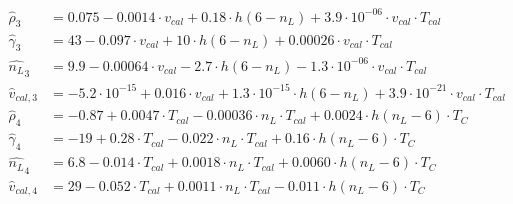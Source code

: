\begin{align}
%
%
%
    \label{eq:emma-phd3}
    \hat{\rho}_3 &= 0.075  -   0.0014 \cdot  v_{cal}  +    0.18 \cdot  h(6-n_L)  + 3.9\cdot 10^{-06} \cdot  v_{cal}\cdot T_{cal} \\
    \label{eq:emma-G3}
    \hat{\gamma}_3 &= 43  -   0.097 \cdot  v_{cal}  +     10 \cdot  h(6-n_L)  + 0.00026 \cdot  v_{cal}\cdot T_{cal} \\
    \label{eq:emma-layr3}
    \hat{n_L}_3 &= 9.9  - 0.00064 \cdot  v_{cal}  -     2.7 \cdot  h(6-n_L)  - 1.3\cdot 10^{-06} \cdot  v_{cal}\cdot T_{cal} \\
    \label{eq:emma-vcal3}
    \hat{v}_{cal,3} &= -5.2\cdot 10^{-15}  +   0.016 \cdot  v_{cal}  + 1.3\cdot 10^{-15} \cdot  h(6-n_L)  + 3.9\cdot 10^{-21} \cdot  v_{cal}\cdot T_{cal} \\
%
    \label{eq:emma-phd4}
    \hat{\rho}_4 &=  -0.87 + 0.0047 \cdot  T_{cal} - 0.00036 \cdot  n_L\cdot T_{cal}  +  0.0024 \cdot  h(n_L-6)\cdot T_{C} \\
    \label{eq:emma-G4}
    \hat{\gamma}_4 &=     -19 + 0.28 \cdot  T_{cal}  - 0.022 \cdot  n_L\cdot T_{cal}  +  0.16 \cdot  h(n_L-6)\cdot T_{C} \\
    \label{eq:emma-layr4}
    \hat{n_L}_4 &=  6.8 - 0.014 \cdot  T_{cal}  + 0.0018 \cdot  n_L\cdot T_{cal}  + 0.0060 \cdot  h(n_L-6)\cdot T_{C} \\
    \label{eq:emma-vcal4}
    \hat{v}_{cal,4} &=  29 - 0.052 \cdot  T_{cal}  + 0.0011 \cdot  n_L\cdot T_{cal}  -  0.011 \cdot  h(n_L-6)\cdot T_{C} 
\end{align}

